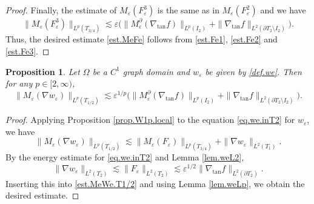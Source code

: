 \documentclass[reqno,12pt]{amsart} %
\newtheorem{proposition}[theorem]{Proposition}
\theoremstyle{definition}
\theoremstyle{remark}
\numberwithin{equation}{section}
\newcommand{\e}{\varepsilon}
\begin{document}
\begin{proof}
Finally, the estimate of $M_\e(F_\e^3)$ is the same as in $M_\e(F_\e^2)$ and we have
\begin{equation}\label{est.Fe3}
    \| M_\e(F_\e^3) \|_{L^p(T_{3/4})} \lesssim \e \big( \| M_\e^\partial(\nabla_{\tan} f) \|_{L^p(I_2)} + \| \nabla_{\tan} f \|_{L^2(\partial T_2 \setminus I_2)} \big).
\end{equation}
Thus, the desired estimate \eqref{est.MeFe} follows from \eqref{est.Fe1}, \eqref{est.Fe2} and \eqref{est.Fe3}.
\end{proof}

\begin{proposition}\label{prop.Dwe.Lp}
    Let $\Omega$ be a $C^1$ graph domain and $w_\e$ be given by \eqref{def.we}. Then for any $p\in [2,\infty)$,
    \begin{equation}
        \| M_\e(\nabla w_\e) \|_{L^p(T_{1/2})} \lesssim \e^{1/p} \big( \| M_\e^\partial(\nabla_{\tan} f) \|_{L^p(I_2)} + \| \nabla_{\tan} f \|_{L^2(\partial T_2 \setminus I_2)} \big).
    \end{equation}
\end{proposition}

\begin{proof}
    Applying Proposition \ref{prop.W1p.local} to the equation \eqref{eq.we.inT2} for $w_\e$, we have
    \begin{equation}\label{est.MeWe.T1/2}
        \| M_\e(\nabla w_\e) \|_{L^p(T_{1/2})} \lesssim \| M_\e(F_\e) \|_{L^p(T_{3/4})} + \| \nabla w_\e \|_{L^2(T_1)}.
    \end{equation}
    By the energy estimate for \eqref{eq.we.inT2} and Lemma \ref{lem.weL2},
    \begin{equation}
        \| \nabla w_\e \|_{L^2(T_2)} \lesssim  \| F_\e \|_{L^2(T_2)} \lesssim \e^{1/2} \| \nabla_{\tan} f \|_{L^2(\partial T_2)}.
    \end{equation}
 Inserting this into \eqref{est.MeWe.T1/2} and using Lemma \ref{lem.weLp}, we obtain the desired estimate.
\end{proof}
\end{document}
